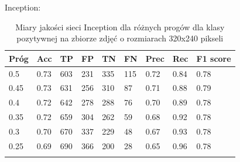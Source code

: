 \documentclass[polish,12pt]{aghthesis}
\begin{document}
\par\noindent Inception:
 \begin{longtable}[h!]{|m{2.0cm}|m{1.2cm}|m{1.2cm}|m{1.2cm}|m{1.2cm}|m{1.2cm}|m{1.2cm}|m{1.2cm}|m{1.6cm}|}
 \hline
 Próg & Acc & TP & FP & TN & FN & Prec & Rec & F1 score\\
 \hline
 0.5 & 0.73 & 603 & 231 & 335 & 115 & 0.72 & 0.84 & 0.78\\
 \hline
 0.45 & 0.73 & 631 & 256 & 310 & 87 & 0.71 & 0.88 & 0.79\\
 \hline
 0.4 & 0.72 & 642 & 278 & 288 & 76 & 0.70 & 0.89 & 0.78\\
 \hline
 0.35 & 0.72 & 659 & 304 & 262 & 59 & 0.68 & 0.92 & 0.78 \\
 \hline
 0.3 & 0.70 & 670 & 337 & 229 & 48 & 0.67 & 0.93 & 0.78\\
 \hline
 0.25 & 0.69 & 690 & 366 & 200 & 28 & 0.65 & 0.96 & 0.78\\
 \hline
\caption{Miary jakości sieci Inception dla różnych progów dla klasy pozytywnej na zbiorze zdjęć o rozmiarach 320x240 pikseli}
\label{table:12}
\end{longtable}
\end{document}
